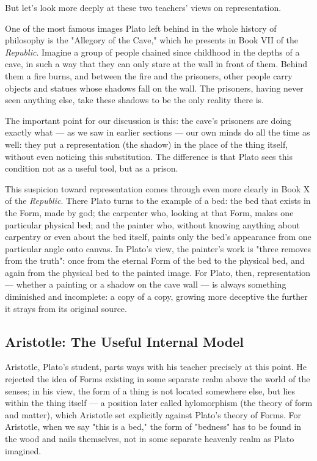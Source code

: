 But let's look more deeply at these two teachers' views on representation.

One of the most famous images Plato left behind in the whole history of philosophy is the "Allegory of the Cave," which he presents in Book VII of the \textit{Republic}. Imagine a group of people chained since childhood in the depths of a cave, in such a way that they can only stare at the wall in front of them. Behind them a fire burns, and between the fire and the prisoners, other people carry objects and statues whose shadows fall on the wall. The prisoners, having never seen anything else, take these shadows to be the only reality there is\autocite{plato-republic}.

The important point for our discussion is this: the cave's prisoners are doing exactly what --- as we saw in earlier sections --- our own minds do all the time as well: they put a representation (the shadow) in the place of the thing itself, without even noticing this substitution. The difference is that Plato sees this condition not as a useful tool, but as a prison.

This suspicion toward representation comes through even more clearly in Book X of the \textit{Republic}. There Plato turns to the example of a bed: the bed that exists in the Form, made by god; the carpenter who, looking at that Form, makes one particular physical bed; and the painter who, without knowing anything about carpentry or even about the bed itself, paints only the bed's appearance from one particular angle onto canvas. In Plato's view, the painter's work is "three removes from the truth": once from the eternal Form of the bed to the physical bed, and again from the physical bed to the painted image\autocite{plato-republic}. For Plato, then, representation --- whether a painting or a shadow on the cave wall --- is always something diminished and incomplete: a copy of a copy, growing more deceptive the further it strays from its original source.

\subsection{Aristotle: The Useful Internal Model}
\label{sub:aristotle-model}

Aristotle, Plato's student, parts ways with his teacher precisely at this point. He rejected the idea of Forms existing in some separate realm above the world of the senses; in his view, the form of a thing is not located somewhere else, but lies within the thing itself --- a position later called hylomorphism (the theory of form and matter), which Aristotle set explicitly against Plato's theory of Forms\autocite{sep-form-matter}. For Aristotle, when we say "this is a bed," the form of "bedness" has to be found in the wood and nails themselves, not in some separate heavenly realm as Plato imagined.


